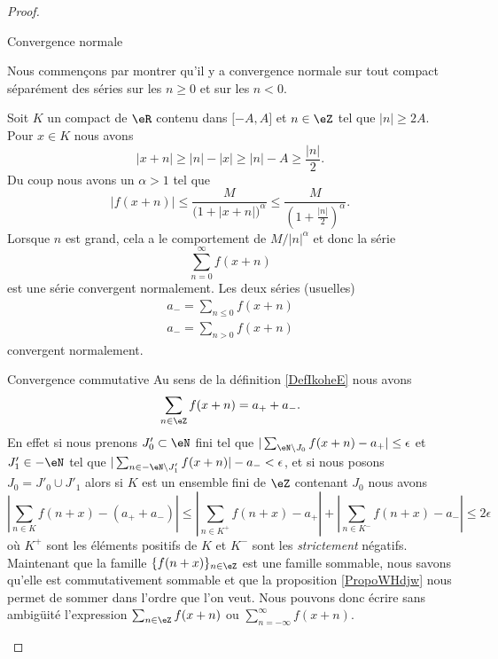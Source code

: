 \begin{proof}
    \begin{subproof}
        \item[Convergence normale]
    
    Nous commençons par montrer qu'il y a convergence normale sur tout compact séparément des séries sur les \( n\geq 0\) et sur les \( n<0\).
    
    Soit \( K\) un compact de \( \eR\) contenu dans \( \mathopen[ -A , A \mathclose]\) et \( n\in \eZ\) tel que \( | n |\geq 2A\). Pour \( x\in K\) nous avons
    \begin{equation}
        | x+n |\geq | n |-| x |\geq | n |-A\geq \frac{ | n | }{ 2 }.
    \end{equation}
    Du coup nous avons un \( \alpha>1\) tel que
    \begin{equation}
        | f(x+n) |\leq \frac{ M }{ \big( 1+| x+n | \big)^{\alpha} }\leq \frac{ M }{ \left( 1+\frac{ | n | }{2} \right)^{\alpha} }.
    \end{equation}
    Lorsque \( n\) est grand, cela a le comportement de \( M/| n |^{\alpha}\) et donc la série
    \begin{equation}
        \sum_{n=0}^{\infty}f(x+n)
    \end{equation}
    est une série convergent normalement. Les deux séries (usuelles) 
    \begin{subequations}
        \begin{align}
            a_-=\sum_{n\leq 0}f(x+n)\\
            a_-=\sum_{n> 0}f(x+n)
        \end{align}
    \end{subequations}
    convergent normalement.
    
\item[Convergence commutative]
    Au sens de la définition \ref{DefIkoheE} nous avons
    \begin{equation}
        \sum_{n\in \eZ}f(x+n)=a_++a_-.
    \end{equation}
    En effet si nous prenons \( J'_0\subset\eN\) fini tel que \( |\sum_{\eN\setminus J_0}f(x+n)-a_+|\leq \epsilon\) et \( J'_1\in -\eN\) tel que \( |\sum_{n\in -\eN\setminus J'_1}f(x+n)|-a_-<\epsilon\), et si nous posons \( J_0=J'_0\cup J'_1\) alors si \( K\) est un ensemble fini de \( \eZ\) contenant \( J_0\) nous avons
    \begin{equation}
        | \sum_{n\in K}f(n+x)-(a_++a_-) |\leq | \sum_{n\in K^+}f(n+x)-a_+ |+| \sum_{n\in K^-}f(n+x)-a_- |\leq 2\epsilon
    \end{equation}
    où $K^+$ sont les éléments positifs de \(K\) et \( K^-\) sont les \emph{strictement} négatifs. Maintenant que la famille \( \{ f(n+x) \}_{n\in \eZ}\) est une famille sommable, nous savons qu'elle est commutativement sommable et que la proposition \ref{PropoWHdjw} nous permet de sommer dans l'ordre que l'on veut. Nous pouvons donc écrire sans ambigüité l'expression \( \sum_{n\in \eZ}f(x+n)\) ou \( \sum_{n=-\infty}^{\infty}f(x+n)\).
    

\end{subproof}
\end{proof}
